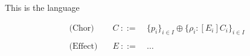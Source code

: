 This is the language



\begin{displaymath}
  \begin{array}{lll}
    \text{(Chor)}  \quad & C \ ::=\ & \{p_i\}_{i\in I}\oplus\{\rho_i: [E_i]C_i\}_{i\in I}\\\\
    \text{(Effect)}\quad & E \ ::=\ & \ldots                                 
  \end{array}
\end{displaymath}


